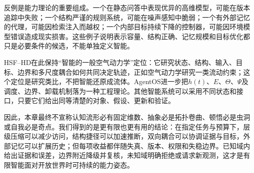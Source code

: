 反例是能力理论的重要组成。一个在静态问答中表现优异的高维模型，可能在版本追踪中失败；一个结构严谨的规则系统，可能在噪声感知中脆弱；一个有外部记忆的代理，可能因检索注入而越权；一个内部目标持续下降的控制器，可能因环境模型错误造成现实损害。这些例子说明表示容量、结构正确、记忆规模和目标优化都只是必要条件的候选，不能单独定义智能。

HSF--HD在此保持“智能的一般空气动力学”定位：它研究状态、结构、输入、目标、边界和多尺度耦合如何共同决定轨迹，正如空气动力学研究一类流动约束；这个定位是研究类比，不把智能还原成流体。AgentOS进一步把$h(t)$、$E$、$\Theta$、$\Psi$及调度、边界、卸载机制落为一种工程理论。其他智能系统可以采用不同状态和接口，只要它们给出同等清楚的对象、假设、更新和验证。

因此，本章最终不宣称认知流形必有固定维数、抽象必是拓扑卷曲、顿悟必是虫洞或自我必是奇点。我们得到的是更有限也更有用的结论：在指定任务与预算下，层级压缩可以减少访问，结构捷径可以加速推断，双向耦合可以协调证据与目标，外部记忆可以扩展历史；但每项收益都伴随失真、版本、权限和失稳边界。已知域内给出证据和误差，边界附近降级并复核，未知域明确拒绝或请求新观测，这才是有限智能面对开放世界时可持续的能力姿态。
